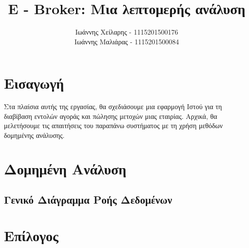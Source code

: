 \documentclass{article}
\begin{document}

\title{E - Broker: Μια λεπτομερής ανάλυση}
\author{
	Ιωάννης Χείλαρης - 1115201500176
	\\
	Ιωάννης Μαλιάρας - 1115201500084
}

\maketitle

\newpage
\tableofcontents


\newpage
\section{Εισαγωγή}
	Στα πλαίσια αυτής της εργασίας, θα σχεδιάσουμε μια εφαρμογή Ιστού για τη διαβίβαση εντολών αγοράς και πώλησης μετοχών μιας εταιρίας.
	Αρχικά, θα μελετήσουμε τις απαιτήσεις του παραπάνω συστήματος με τη χρήση μεθόδων δομημένης ανάλυσης.

	
\newpage
\section{Δομημένη Ανάλυση}
	\subsection{Γενικό Διάγραμμα Ροής Δεδομένων}

	\subsection{}

\newpage
\section{Επίλογος}
\end{document}

